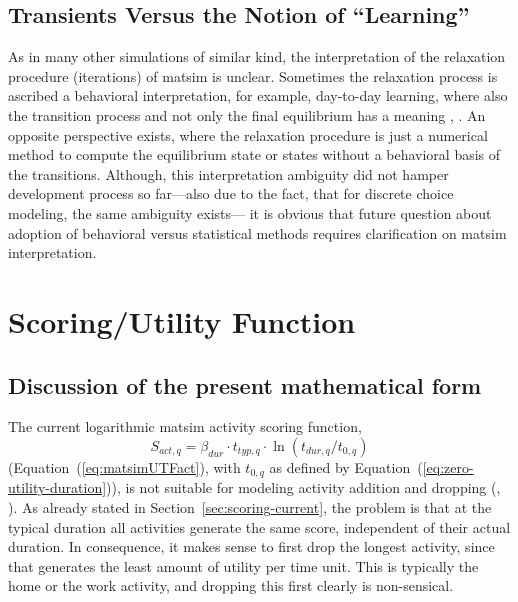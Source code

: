 
\subsection{Transients Versus the Notion of \enquote{Learning}}
\label{sec:transients-vs-learning}

As in many other simulations of similar kind, the interpretation of the relaxation procedure (iterations) of \gls{matsim} is unclear. 
%
Sometimes the relaxation process is ascribed a behavioral interpretation, for example, day-to-day learning, where also the transition process and not only the final equilibrium has a meaning \citep[][p.128]{LiuEtAl_TransResA_2006}, \citep[][p.523]{NagelBarrett1997feedback}. 
%
An opposite perspective exists, where the relaxation procedure is just a numerical method to compute the equilibrium state or states without a behavioral basis of the transitions.
%
Although, this interpretation ambiguity did not hamper development process so far---also due to the fact, that for discrete choice modeling, the same ambiguity exists---
it is obvious that future question about adoption of behavioral versus statistical methods 
requires clarification on \gls{matsim} interpretation.


\section{Scoring/Utility Function}
\label{sec:future-of-scoring-function}

\subsection{Discussion of the present mathematical form}
\label{sec:discussion-present-math-form}

The current logarithmic \gls{matsim} activity scoring function,
\[
S_{act,q} = \beta_{dur} \cdot t_{typ,q} \cdot \ln(t_{dur,q}/t_{0,q}) 
\]
(\cf Equation~(\ref{eq:matsimUTFact}), with $t_{0,q}$ as defined by Equation~(\ref{eq:zero-utility-duration})), is not suitable for modeling activity
addition and dropping (\citet[][p.127f]{Feil_PhDThesis_2010}, \citet[][]{MATSim_Userguide_2015}).
%
As already stated in Section~\ref{sec:scoring-current}, the problem is that 
at the typical duration all activities generate the same score, independent of their actual duration.  In consequence, it makes sense to first drop the longest activity, since that generates the least amount of utility per time unit. This is typically the home or the work activity, and dropping this first clearly is non-sensical.

